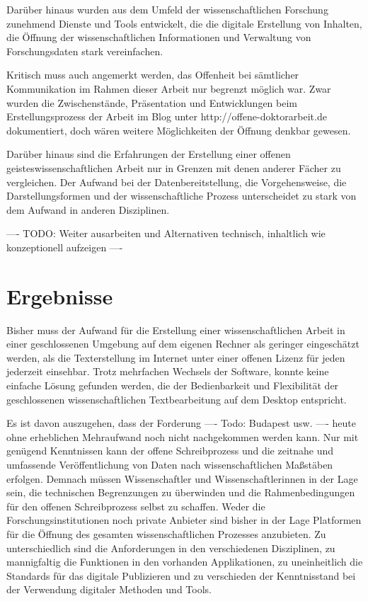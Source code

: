 Darüber hinaus wurden aus dem Umfeld der wissenschaftlichen Forschung zunehmend Dienste und Tools entwickelt, die die digitale Erstellung von Inhalten, die Öffnung der wissenschaftlichen Informationen und Verwaltung von Forschungsdaten stark vereinfachen.

Kritisch muss auch angemerkt werden, das Offenheit bei sämtlicher Kommunikation im Rahmen dieser Arbeit nur begrenzt möglich war. Zwar wurden die Zwischenstände, Präsentation und Entwicklungen beim Erstellungsprozess der Arbeit im Blog unter http://offene-doktorarbeit.de dokumentiert, doch wären weitere Möglichkeiten der Öffnung denkbar gewesen.

Darüber hinaus sind die Erfahrungen der Erstellung einer offenen geisteswissenschaftlichen Arbeit nur in Grenzen mit denen anderer Fächer zu vergleichen. Der Aufwand bei der Datenbereitstellung, die Vorgehensweise, die Darstellungsformen und der wissenschaftliche Prozess unterscheidet zu stark von dem Aufwand in anderen Disziplinen.

---- TODO: Weiter ausarbeiten und Alternativen technisch, inhaltlich wie konzeptionell aufzeigen ----

\section{Ergebnisse}

Bisher muss der Aufwand für die Erstellung einer wissenschaftlichen Arbeit in einer geschlossenen Umgebung auf dem eigenen Rechner als geringer eingeschätzt werden, als die Texterstellung im Internet unter einer offenen Lizenz für jeden jederzeit einsehbar. Trotz mehrfachen Wechsels der Software, konnte keine einfache Lösung gefunden werden, die der Bedienbarkeit und Flexibilität der geschlossenen wissenschaftlichen Textbearbeitung auf dem Desktop entspricht.

Es ist davon auszugehen, dass der Forderung ---- Todo: Budapest usw. ---- heute ohne erheblichen Mehraufwand noch nicht nachgekommen werden kann. Nur mit genügend Kenntnissen kann der offene Schreibprozess und die zeitnahe und umfassende Veröffentlichung von Daten nach wissenschaftlichen Maßstäben erfolgen. Demnach müssen Wissenschaftler und Wissenschaftlerinnen in der Lage sein, die technischen Begrenzungen zu überwinden und die Rahmenbedingungen für den offenen Schreibprozess selbst zu schaffen. Weder die Forschungsinstitutionen noch private Anbieter sind bisher in der Lage Platformen für die Öffnung des gesamten wissenschaftlichen Prozesses anzubieten. Zu unterschiedlich sind die Anforderungen in den verschiedenen Disziplinen, zu mannigfaltig die Funktionen in den vorhanden Applikationen, zu uneinheitlich die Standards für das digitale Publizieren und zu verschieden der Kenntnisstand bei der Verwendung digitaler Methoden und Tools.

